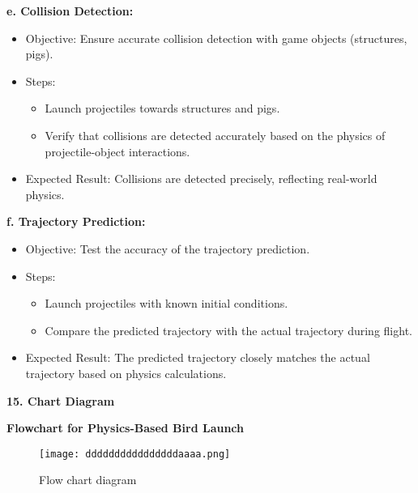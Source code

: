 \documentclass[
]{article}
\begin{document}
\textbf{e. Collision Detection:}

\begin{itemize}
\item
  Objective: Ensure accurate collision detection with game objects
  (structures, pigs).
\item
  Steps:

  \begin{itemize}
  \item
    Launch projectiles towards structures and pigs.
  \item
    Verify that collisions are detected accurately based on the physics
    of projectile-object interactions.
  \end{itemize}
\item
  Expected Result: Collisions are detected precisely, reflecting
  real-world physics.
\end{itemize}

\textbf{f. Trajectory Prediction:}

\begin{itemize}
\item
  Objective: Test the accuracy of the trajectory prediction.
\item
  Steps:

  \begin{itemize}
  \item
    Launch projectiles with known initial conditions.
  \item
    Compare the predicted trajectory with the actual trajectory during
    flight.
  \end{itemize}
\item
  Expected Result: The predicted trajectory closely matches the actual
  trajectory based on physics calculations.
\end{itemize}

\textbf{15. Chart Diagram}

\protect\hypertarget{Ajj}{}{}\textbf{Flowchart for Physics-Based Bird
Launch}

\begin{figure}
    \centering
    \texttt{[image: ddddddddddddddddaaaa.png]}
    \caption{Flow chart diagram}
    \label{fig:enter-label}
\end{figure}
\end{document}
